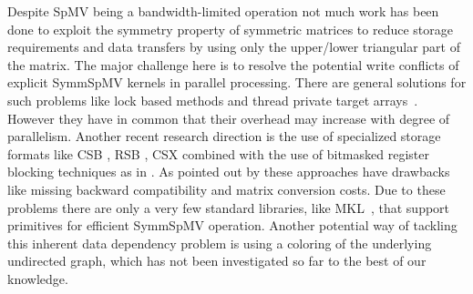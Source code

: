 


Despite \acrshort{SpMV} being a bandwidth-limited operation not much work has 
been done to exploit the symmetry property of symmetric matrices to reduce
storage requirements and data transfers by using only the upper/lower triangular part of the matrix.
The major challenge here is to resolve the potential write conflicts of explicit 
\acrfull{SymmSpMV} kernels in parallel processing.
There are general solutions for such problems like 
lock based methods and thread private target
arrays~\cite{sparseX,thread_private_symm_spmv,Krotkiewski:2010:PSS:1752612.1752682,Mironowicz:2015}. However they have in common that their overhead may increase with degree of parallelism.
Another recent research direction is the use of specialized storage formats 
like CSB \cite{CSB}, RSB \cite{RSB}, CSX \cite{sparseX} combined with the use of bitmasked 
register blocking techniques as in \cite{Buluc:2011:RMA:2058524.2059503}. As pointed out 
by \cite{liu2015spmv} these approaches have drawbacks like missing backward compatibility and matrix conversion costs. 
Due to these problems there are only a very few standard libraries, like 
\acrshort{MKL}~\cite{MKL}, that support primitives for efficient \acrshort{SymmSpMV} operation.
Another potential way of tackling this inherent data dependency problem is using a \DTWO coloring 
 of the underlying undirected graph, which has not been investigated so far to the best of our knowledge.

